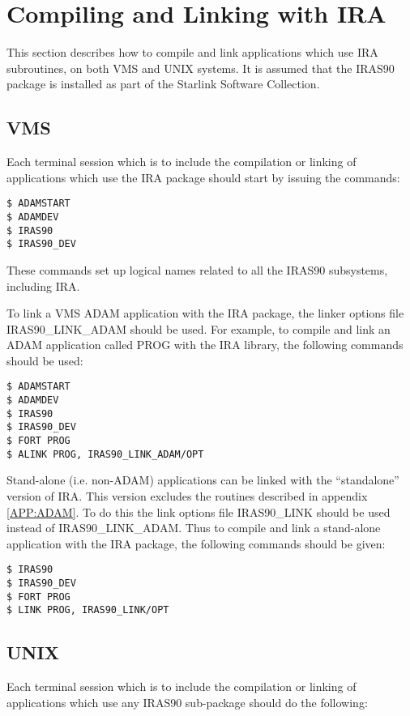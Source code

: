 \section {Compiling and Linking with IRA}
\label{SEC:LINK}
This section describes how to compile and link applications which use IRA
subroutines, on both VMS and UNIX systems. It is assumed that the IRAS90 package
is installed as part of the Starlink Software Collection.

\subsection{VMS}
Each terminal session which is to include the compilation or linking of 
applications which use the IRA package should start by issuing the commands:

\begin{verbatim}
$ ADAMSTART
$ ADAMDEV
$ IRAS90
$ IRAS90_DEV
\end{verbatim}

These commands set up logical names related to all the IRAS90
subsystems, including IRA. 

To link a VMS ADAM application with the IRA package, the linker options file
IRAS90\_LINK\_ADAM should be used. For example, to compile and link an ADAM
application called PROG with the IRA library, the following commands should be
used: 

\begin{verbatim}
$ ADAMSTART
$ ADAMDEV
$ IRAS90
$ IRAS90_DEV
$ FORT PROG
$ ALINK PROG, IRAS90_LINK_ADAM/OPT 
\end{verbatim}

Stand-alone (i.e. non-ADAM) applications can be linked with the ``standalone''
version of IRA. This version excludes the routines described in appendix
\ref{APP:ADAM}. To do this the link options file IRAS90\_LINK should be used
instead of IRAS90\_LINK\_ADAM. Thus to compile and link a stand-alone
application with the IRA package, the following commands should be given: 

\begin{verbatim}
$ IRAS90
$ IRAS90_DEV
$ FORT PROG
$ LINK PROG, IRAS90_LINK/OPT 
\end{verbatim}

\subsection{UNIX}


Each terminal session which is to include the compilation or linking of 
applications which use any IRAS90 sub-package should do the following:

